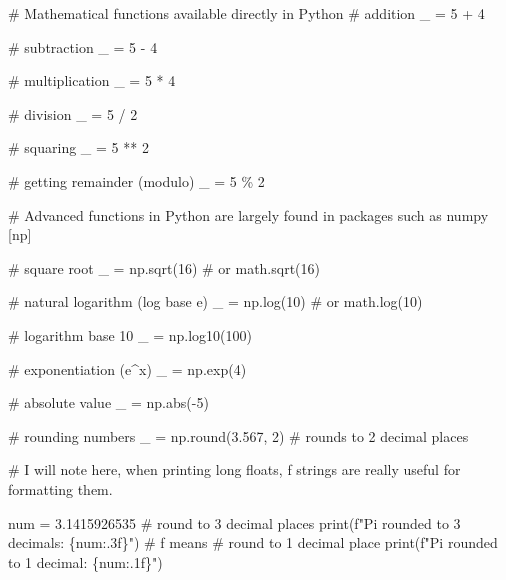 \documentclass[
  letterpaper,
  DIV=11,
  numbers=noendperiod]{scrartcl}
\newenvironment{Shaded}{\begin{snugshade}}{\end{snugshade}}
\newcommand{\BuiltInTok}[1]{\textcolor[rgb]{0.00,0.23,0.31}{#1}}
\newcommand{\CommentTok}[1]{\textcolor[rgb]{0.37,0.37,0.37}{#1}}
\newcommand{\DecValTok}[1]{\textcolor[rgb]{0.68,0.00,0.00}{#1}}
\newcommand{\FloatTok}[1]{\textcolor[rgb]{0.68,0.00,0.00}{#1}}
\newcommand{\NormalTok}[1]{\textcolor[rgb]{0.00,0.23,0.31}{#1}}
\newcommand{\OperatorTok}[1]{\textcolor[rgb]{0.37,0.37,0.37}{#1}}
\newcommand{\SpecialCharTok}[1]{\textcolor[rgb]{0.37,0.37,0.37}{#1}}
\newcommand{\SpecialStringTok}[1]{\textcolor[rgb]{0.13,0.47,0.30}{#1}}
\begin{document}
\begin{Shaded}
\begin{Highlighting}[]
\CommentTok{\# Mathematical functions available directly in Python}
\CommentTok{\# addition}
\NormalTok{\_ }\OperatorTok{=} \DecValTok{5} \OperatorTok{+} \DecValTok{4}

\CommentTok{\# subtraction}
\NormalTok{\_ }\OperatorTok{=} \DecValTok{5} \OperatorTok{{-}} \DecValTok{4}

\CommentTok{\# multiplication}
\NormalTok{\_ }\OperatorTok{=} \DecValTok{5} \OperatorTok{*} \DecValTok{4}

\CommentTok{\# division}
\NormalTok{\_ }\OperatorTok{=}  \DecValTok{5} \OperatorTok{/} \DecValTok{2}

\CommentTok{\# squaring}
\NormalTok{\_ }\OperatorTok{=}  \DecValTok{5} \OperatorTok{**} \DecValTok{2}

\CommentTok{\# getting remainder (modulo)}
\NormalTok{\_ }\OperatorTok{=}  \DecValTok{5} \OperatorTok{\%} \DecValTok{2}

\CommentTok{\# Advanced functions in Python are largely found in packages such as numpy [np]}

\CommentTok{\# square root}
\NormalTok{\_ }\OperatorTok{=}\NormalTok{ np.sqrt(}\DecValTok{16}\NormalTok{)  }\CommentTok{\# or math.sqrt(16)}

\CommentTok{\# natural logarithm (log base e)}
\NormalTok{\_ }\OperatorTok{=}\NormalTok{ np.log(}\DecValTok{10}\NormalTok{)  }\CommentTok{\# or math.log(10)}

\CommentTok{\# logarithm base 10}
\NormalTok{\_ }\OperatorTok{=}\NormalTok{ np.log10(}\DecValTok{100}\NormalTok{)}

\CommentTok{\# exponentiation (e\^{}x)}
\NormalTok{\_ }\OperatorTok{=}\NormalTok{ np.exp(}\DecValTok{4}\NormalTok{)}

\CommentTok{\# absolute value}
\NormalTok{\_ }\OperatorTok{=}\NormalTok{ np.}\BuiltInTok{abs}\NormalTok{(}\OperatorTok{{-}}\DecValTok{5}\NormalTok{)}

\CommentTok{\# rounding numbers}
\NormalTok{\_ }\OperatorTok{=}\NormalTok{ np.}\BuiltInTok{round}\NormalTok{(}\FloatTok{3.567}\NormalTok{, }\DecValTok{2}\NormalTok{)  }\CommentTok{\# rounds to 2 decimal places}



\CommentTok{\# I will note here, when printing long floats, f strings are really useful for formatting them.}

\NormalTok{num }\OperatorTok{=} \FloatTok{3.1415926535}
\CommentTok{\# round to 3 decimal places}
\BuiltInTok{print}\NormalTok{(}\SpecialStringTok{f"Pi rounded to 3 decimals: }\SpecialCharTok{\{}\NormalTok{num}\SpecialCharTok{:.3f\}}\SpecialStringTok{"}\NormalTok{) }\CommentTok{\# f means }
\CommentTok{\# round to 1 decimal place}
\BuiltInTok{print}\NormalTok{(}\SpecialStringTok{f"Pi rounded to 1 decimal: }\SpecialCharTok{\{}\NormalTok{num}\SpecialCharTok{:.1f\}}\SpecialStringTok{"}\NormalTok{)}


\end{Highlighting}
\end{Shaded}
\end{document}
